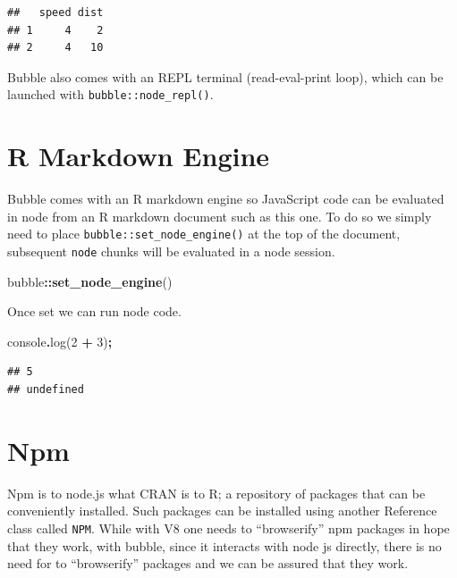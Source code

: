 \documentclass[
]{krantz}
\makeatletter
\newenvironment{Shaded}{\begin{snugshade}}{\end{snugshade}}
\newcommand{\BuiltInTok}[1]{#1}
\newcommand{\DecValTok}[1]{\textcolor[rgb]{0.06,0.06,0.06}{#1}}
\newcommand{\FunctionTok}[1]{\textcolor[rgb]{0,0,0}{#1}}
\newcommand{\KeywordTok}[1]{\textcolor[rgb]{0.27,0.27,0.27}{\textbf{#1}}}
\newcommand{\NormalTok}[1]{#1}
\newcommand{\OperatorTok}[1]{\textcolor[rgb]{0.43,0.43,0.43}{\textbf{#1}}}
\newenvironment{kframe}{%
\medskip{}
\setlength{\fboxsep}{.8em}
 \def\at@end@of@kframe{}%
 \ifinner\ifhmode%
  \def\at@end@of@kframe{\end{minipage}}%
  \begin{minipage}{\columnwidth}%
 \fi\fi%
 \def\FrameCommand##1{\hskip\@totalleftmargin \hskip-\fboxsep
 \colorbox{shadecolor}{##1}\hskip-\fboxsep
     \hskip-\linewidth \hskip-\@totalleftmargin \hskip\columnwidth}%
 \MakeFramed {\advance\hsize-\width
   \@totalleftmargin\z@ \linewidth\hsize
   \@setminipage}}%
 {\par\unskip\endMakeFramed%
 \at@end@of@kframe}
\renewenvironment{Shaded}{\begin{kframe}}{\end{kframe}}
\makeatother
\begin{document}
\begin{Shaded}
\end{Shaded}

\begin{verbatim}
##   speed dist
## 1     4    2
## 2     4   10
\end{verbatim}

Bubble also comes with an REPL terminal (read-eval-print loop), which can be launched with \texttt{bubble::node\_repl()}.

\hypertarget{r-markdown-engine}{%
\section*{R Markdown Engine}\label{r-markdown-engine}}


Bubble comes with an R markdown engine so JavaScript code can be evaluated in node from an R markdown document such as this one. To do so we simply need to place \texttt{bubble::set\_node\_engine()} at the top of the document, subsequent \texttt{node} chunks will be evaluated in a node session.

\begin{Shaded}
\begin{Highlighting}[]
\NormalTok{bubble}\OperatorTok{::}\KeywordTok{set\_node\_engine}\NormalTok{()}
\end{Highlighting}
\end{Shaded}

Once set we can run node code.

\begin{Shaded}
\begin{Highlighting}[]
\BuiltInTok{console}\OperatorTok{.}\FunctionTok{log}\NormalTok{(}\DecValTok{2} \OperatorTok{+} \DecValTok{3}\NormalTok{)}\OperatorTok{;}
\end{Highlighting}
\end{Shaded}

\begin{verbatim}
## 5
## undefined
\end{verbatim}

\hypertarget{npm}{%
\section*{Npm}\label{npm}}


Npm is to node.js what CRAN is to R; a repository of packages that can be conveniently installed. Such packages can be installed using another Reference class called \texttt{NPM}. While with V8 one needs to ``browserify'' npm packages in hope that they work, with bubble, since it interacts with node js directly, there is no need for to ``browserify'' packages and we can be assured that they work.
\end{document}
